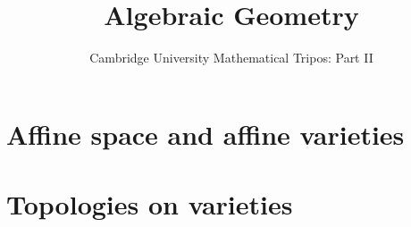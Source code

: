 \documentclass{article}
\title{Algebraic Geometry}
\author{Cambridge University Mathematical Tripos: Part II}
\begin{document}
\maketitle

\tableofcontentsnewpage{}


\section{Affine space and affine varieties}

\section{Topologies on varieties}

\end{document}
